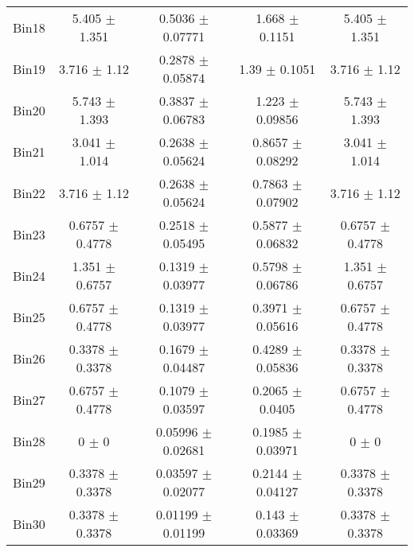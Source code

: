 \begin{tabular}{@{\extracolsep{4pt}}lcccc@{}}
     Bin18 & 5.405 $\pm$ 1.351 & 0.5036 $\pm$ 0.07771 & 1.668 $\pm$ 0.1151 & 5.405 $\pm$ 1.351 \\ 
     Bin19 & 3.716 $\pm$ 1.12 & 0.2878 $\pm$ 0.05874 & 1.39 $\pm$ 0.1051 & 3.716 $\pm$ 1.12 \\ 
     Bin20 & 5.743 $\pm$ 1.393 & 0.3837 $\pm$ 0.06783 & 1.223 $\pm$ 0.09856 & 5.743 $\pm$ 1.393 \\ 
     Bin21 & 3.041 $\pm$ 1.014 & 0.2638 $\pm$ 0.05624 & 0.8657 $\pm$ 0.08292 & 3.041 $\pm$ 1.014 \\ 
     Bin22 & 3.716 $\pm$ 1.12 & 0.2638 $\pm$ 0.05624 & 0.7863 $\pm$ 0.07902 & 3.716 $\pm$ 1.12 \\ 
     Bin23 & 0.6757 $\pm$ 0.4778 & 0.2518 $\pm$ 0.05495 & 0.5877 $\pm$ 0.06832 & 0.6757 $\pm$ 0.4778 \\ 
     Bin24 & 1.351 $\pm$ 0.6757 & 0.1319 $\pm$ 0.03977 & 0.5798 $\pm$ 0.06786 & 1.351 $\pm$ 0.6757 \\ 
     Bin25 & 0.6757 $\pm$ 0.4778 & 0.1319 $\pm$ 0.03977 & 0.3971 $\pm$ 0.05616 & 0.6757 $\pm$ 0.4778 \\ 
     Bin26 & 0.3378 $\pm$ 0.3378 & 0.1679 $\pm$ 0.04487 & 0.4289 $\pm$ 0.05836 & 0.3378 $\pm$ 0.3378 \\ 
     Bin27 & 0.6757 $\pm$ 0.4778 & 0.1079 $\pm$ 0.03597 & 0.2065 $\pm$ 0.0405 & 0.6757 $\pm$ 0.4778 \\ 
     Bin28 & 0 $\pm$ 0 & 0.05996 $\pm$ 0.02681 & 0.1985 $\pm$ 0.03971 & 0 $\pm$ 0 \\ 
     Bin29 & 0.3378 $\pm$ 0.3378 & 0.03597 $\pm$ 0.02077 & 0.2144 $\pm$ 0.04127 & 0.3378 $\pm$ 0.3378 \\ 
     Bin30 & 0.3378 $\pm$ 0.3378 & 0.01199 $\pm$ 0.01199 & 0.143 $\pm$ 0.03369 & 0.3378 $\pm$ 0.3378 \\ 
\hline\hline
  \end{tabular}
